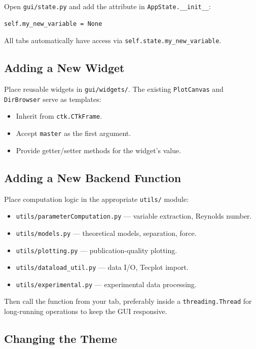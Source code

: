 \documentclass[11pt,letterpaper]{article}
\begin{document}
Open \texttt{gui/state.py} and add the attribute in
\texttt{AppState.\_\_init\_\_}:

\begin{lstlisting}
self.my_new_variable = None
\end{lstlisting}

All tabs automatically have access via \texttt{self.state.my\_new\_variable}.

\subsection{Adding a New Widget}

Place reusable widgets in \texttt{gui/widgets/}.  The existing
\texttt{PlotCanvas} and \texttt{DirBrowser} serve as templates:

\begin{itemize}
  \item Inherit from \texttt{ctk.CTkFrame}.
  \item Accept \texttt{master} as the first argument.
  \item Provide getter/setter methods for the widget's value.
\end{itemize}

\subsection{Adding a New Backend Function}

Place computation logic in the appropriate \texttt{utils/} module:

\begin{itemize}
  \item \texttt{utils/parameterComputation.py} — variable extraction, Reynolds
        number.
  \item \texttt{utils/models.py} — theoretical models, separation, force.
  \item \texttt{utils/plotting.py} — publication-quality plotting.
  \item \texttt{utils/dataload\_util.py} — data I/O, Tecplot import.
  \item \texttt{utils/experimental.py} — experimental data processing.
\end{itemize}

Then call the function from your tab, preferably inside a
\texttt{threading.Thread} for long-running operations to keep the GUI
responsive.

\subsection{Changing the Theme}
\end{document}
